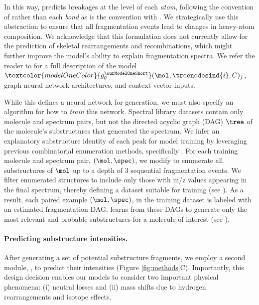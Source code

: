 \documentclass[journal=jcim,manuscript=article]{achemso}
\begin{document}
In this way, \ourModel predicts breakages at the level of each \emph{atom}, following the convention of \MAGMA \cite{ridder_automatic_2014} rather than each \emph{bond} as is the convention with \cfmModel \cite{allen_competitive_2015}. We strategically use this abstraction to ensure that  all fragmentation events lead to changes in heavy-atom composition. We acknowledge that this formulation does not currently allow for the prediction of skeletal rearrangements and recombinations, which might further improve the model's ability to explain fragmentation spectra. We refer the reader to  for a full description of the model  $\textcolor{modelOneColor}{g_{\theta}^{\ourModelOneShort}}(\mol,\treenodesind{i}, C)_j$,
 graph neural network architectures, and context vector inputs.
 
 While this defines a neural network for generation, we must also specify an algorithm for how to \emph{train} this network. %
 Spectral library datasets contain only molecule and spectrum pairs, but not the directed acyclic graph (DAG) $\tree$ of the molecule's substructures that generated the spectrum. We infer an explanatory substructure identity of each peak for model training by leveraging previous combinatorial enumeration methods, specifically \MAGMA \cite{ridder_automatic_2014}. For each training molecule and spectrum pair, $(\mol, \spec)$, we modify \MAGMA to enumerate all substructures of $\mol$ up to a depth of $3$ sequential fragmentation events. We filter enumerated structures to include only those  with m/z values appearing in the final spectrum, thereby defining a dataset suitable for training \ourModel \ourModelOneShort (see ). As a result, each paired example $(\mol, \spec)$, in the training dataset is labeled with an estimated fragmentation DAG. \ourModelOneShort learns from these DAGs to generate only the most relevant and probable substructures for a molecule of interest (see ).


\paragraph{Predicting substructure intensities.} After generating a set of potential substructure fragments, we employ a second module, \ourModel \ourModelTwoShort, to predict their intensities (Figure \ref{fig:methods}C). Importantly, this design decision enables our models to consider two important physical phenomena: (i)  neutral losses and (ii) mass shifts due to hydrogen rearrangements and isotope effects.
\end{document}
